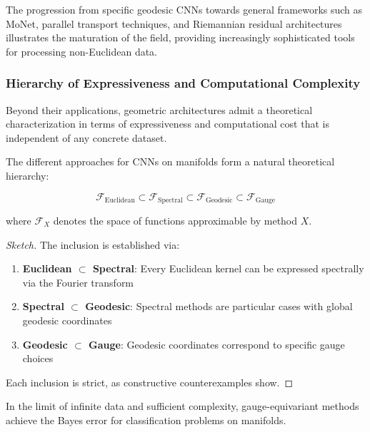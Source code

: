 The progression from specific geodesic CNNs towards general frameworks such as MoNet, parallel transport techniques, and Riemannian residual architectures illustrates the maturation of the field, providing increasingly sophisticated tools for processing non-Euclidean data.

\subsubsection{Hierarchy of Expressiveness and Computational Complexity}

Beyond their applications, geometric architectures admit a theoretical characterization in terms of expressiveness and computational cost that is independent of any concrete dataset.

\begin{theorem}
The different approaches for CNNs on manifolds form a natural theoretical hierarchy:

\begin{equation}
\mathcal{F}_{\text{Euclidean}} \subset \mathcal{F}_{\text{Spectral}} \subset \mathcal{F}_{\text{Geodesic}} \subset \mathcal{F}_{\text{Gauge}}
\end{equation}

where $\mathcal{F}_X$ denotes the space of functions approximable by method $X$.
\end{theorem}

\begin{proof}[Sketch]
The inclusion is established via:
\begin{enumerate}
    \item \textbf{Euclidean $\subset$ Spectral}: Every Euclidean kernel can be expressed spectrally via the Fourier transform
    \item \textbf{Spectral $\subset$ Geodesic}: Spectral methods are particular cases with global geodesic coordinates
    \item \textbf{Geodesic $\subset$ Gauge}: Geodesic coordinates correspond to specific gauge choices
\end{enumerate}
Each inclusion is strict, as constructive counterexamples show.
\end{proof}

\begin{corollary}
In the limit of infinite data and sufficient complexity, gauge-equivariant methods achieve the Bayes error for classification problems on manifolds.
\end{corollary}

